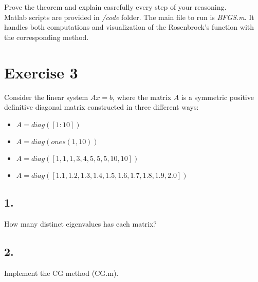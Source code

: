 \documentclass[unicode,11pt,a4paper,oneside,numbers=endperiod,openany]{scrartcl}
\begin{document}
\noindent Prove the theorem and explain casrefully every step of your reasoning.\\


Matlab scripts are provided in \textit{/code} folder.
The main file to run is \textit{BFGS.m}.
It handles both computations and visualization of the Rosenbrock's function with the corresponding method.


\clearpage

\section*{Exercise 3}

Consider the linear system $Ax = b$,
where the matrix $A$ is a symmetric positive definitive diagonal matrix
constructed in three different ways:

\begin{itemize}
    \item[ ] $A = diag([1:10])$
    \item[ ] $A = diag(ones(1,10))$
    \item[ ] $A = diag([1, 1, 1, 3, 4, 5, 5, 5, 10, 10])$
    \item[ ] $A = diag([1.1, 1.2, 1.3, 1.4, 1.5, 1.6, 1.7, 1.8, 1.9, 2.0])$
\end{itemize}

\subsection*{1.}
How many distinct eigenvalues has each matrix?

\subsection*{2.}
Implement the CG method (CG.m).
\end{document}
